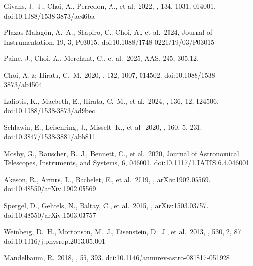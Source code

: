 \documentclass[12pt]{pasj01}
\begin{document}
\begin{thebibliography}{} %
 
 Givans, J.~J., Choi, A., Porredon, A., et al.\ 2022, \pasp, 134, 1031, 014001. doi:10.1088/1538-3873/ac46ba

 Plazas Malag{\'o}n, A.~A., Shapiro, C., Choi, A., et al.\ 2024, Journal of Instrumentation, 19, 3, P03015. doi:10.1088/1748-0221/19/03/P03015

 Paine, J., Choi, A., Merchant, C., et al.\ 2025, AAS, 245, 305.12. 

 Choi, A. \& Hirata, C.~M.\ 2020, \pasp, 132, 1007, 014502. doi:10.1088/1538-3873/ab4504

 Laliotis, K., Macbeth, E., Hirata, C.~M., et al.\ 2024, \pasp, 136, 12, 124506. doi:10.1088/1538-3873/ad9bec

 Schlawin, E., Leisenring, J., Misselt, K., et al.\ 2020, \aj, 160, 5, 231. doi:10.3847/1538-3881/abb811


 Mosby, G., Rauscher, B.~J., Bennett, C., et al.\ 2020, Journal of Astronomical Telescopes, Instruments, and Systems, 6, 046001. doi:10.1117/1.JATIS.6.4.046001

 Akeson, R., Armus, L., Bachelet, E., et al.\ 2019, , arXiv:1902.05569. doi:10.48550/arXiv.1902.05569

 Spergel, D., Gehrels, N., Baltay, C., et al.\ 2015, , arXiv:1503.03757. doi:10.48550/arXiv.1503.03757

 Weinberg, D.~H., Mortonson, M.~J., Eisenstein, D.~J., et al.\ 2013, \physrep, 530, 2, 87. doi:10.1016/j.physrep.2013.05.001

 Mandelbaum, R.\ 2018, \araa, 56, 393. doi:10.1146/annurev-astro-081817-051928


\end{thebibliography}
\end{document}
